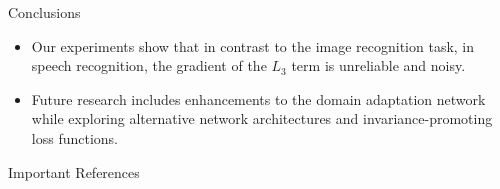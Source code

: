 \documentclass[final]{beamer}
\newlength{\onecolwid}
\begin{document}
\begin{frame}[t]
\begin{columns}[t]
\begin{column}{\onecolwid}
\begin{block}{Conclusions}
\begin{itemize}
        \item Our experiments show that in contrast to the image recognition task, in speech recognition, the 
    gradient of the $L_3$ term is unreliable and noisy. 
    
        \item Future research includes enhancements to the domain adaptation network while exploring 
            alternative network architectures and invariance-promoting loss functions.
    \end{itemize}
\end{block}
\begin{block}{Important References}
    
    
\end{block}




\end{column} %

\end{columns} %

\end{frame} %
\end{document}
